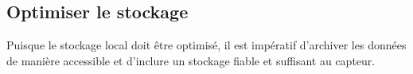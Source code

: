 

\subsection{Optimiser le stockage}
\label{s:beo_obj_stockage}

Puisque le stockage local doit être optimisé, il est impératif d'archiver les données de manière accessible et d'inclure un stockage fiable et suffisant au capteur.
